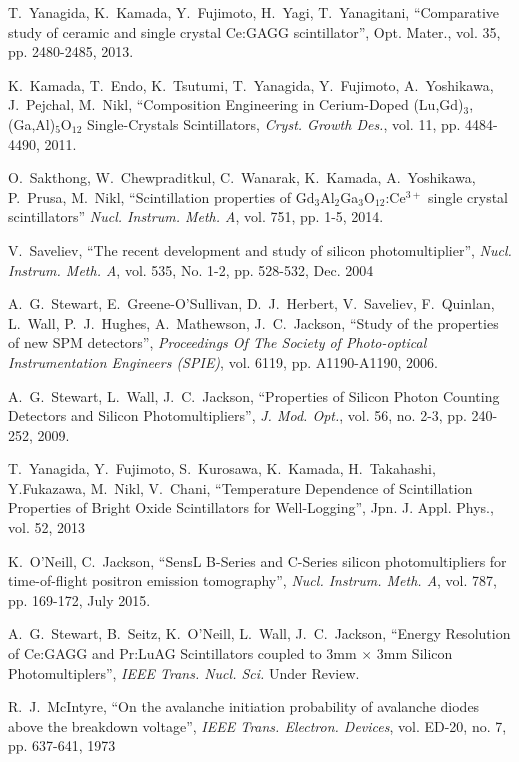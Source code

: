 \documentclass[journal]{IEEEtran}
\begin{document}
\begin{thebibliography}{1}
T.~Yanagida, K.~Kamada, Y.~Fujimoto, H.~Yagi, T.~Yanagitani, ``Comparative study of ceramic and single crystal Ce:GAGG scintillator'', Opt. Mater., vol. 35, pp. 2480-2485, 2013.

K.~Kamada, T.~Endo, K.~Tsutumi, T.~Yanagida, Y.~Fujimoto, A.~Yoshikawa, J.~Pejchal, M.~Nikl, ``Composition Engineering in Cerium-Doped (Lu,Gd)$_{3}$,(Ga,Al)$_{5}$O$_{12}$ Single-Crystals Scintillators, \emph{Cryst. Growth Des.}, vol. 11, pp. 4484-4490, 2011.

O.~Sakthong, W.~Chewpraditkul, C.~Wanarak, K.~Kamada, A.~Yoshikawa, P.~Prusa, M.~Nikl, ``Scintillation properties of Gd$_{3}$Al$_{2}$Ga$_{3}$O$_{12}$:Ce$^{3+}$ single crystal scintillators'' \emph{Nucl.  Instrum. Meth. A}, vol. 751, pp. 1-5, 2014. 

V.~Saveliev, ``The recent development and study of silicon photomultiplier'', \emph{Nucl. Instrum. Meth. A}, vol. 535, No. 1-2, pp. 528-532, Dec. 2004

A.~G.~Stewart, E.~Greene-O'Sullivan, D.~J.~Herbert, V.~Saveliev, F.~Quinlan, L.~Wall, P.~J.~Hughes, A.~Mathewson, J.~C.~Jackson, ``Study of the properties of new SPM detectors'', \emph{Proceedings Of The Society of Photo-optical Instrumentation Engineers (SPIE)}, vol. 6119, pp. A1190-A1190, 2006.

A.~G.~Stewart, L.~Wall, J.~C.~Jackson, ``Properties of Silicon Photon Counting Detectors and Silicon Photomultipliers'', \emph{J. Mod. Opt.}, vol. 56, no. 2-3, pp. 240-252, 2009.

T.~Yanagida, Y.~Fujimoto, S.~Kurosawa, K.~Kamada, H.~Takahashi, Y.Fukazawa, M.~Nikl, V.~Chani, ``Temperature Dependence of Scintillation Properties of Bright Oxide Scintillators for Well-Logging'', Jpn. J. Appl. Phys., vol. 52, 2013

K.~O'Neill, C.~Jackson, ``SensL B-Series and C-Series silicon photomultipliers for time-of-flight positron emission tomography'', \emph{Nucl. Instrum. Meth. A}, vol. 787, pp. 169-172, July 2015.

A.~G.~Stewart, B.~Seitz, K.~O'Neill, L.~Wall, J.~C.~Jackson, ``Energy Resolution of Ce:GAGG and Pr:LuAG Scintillators coupled to 3mm $\times$ 3mm Silicon Photomultiplers'', \emph{IEEE Trans. Nucl. Sci.} Under Review.

R.~J.~McIntyre, ``On the avalanche initiation probability of avalanche diodes above the  breakdown voltage'', \emph{IEEE Trans. Electron. Devices}, vol. ED-20, no. 7, pp. 637-641, 1973


\end{thebibliography}
\end{document}
